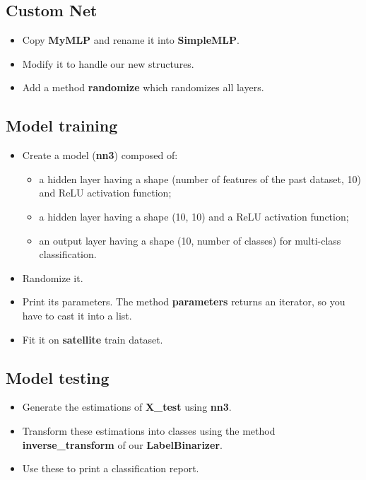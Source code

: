 \documentclass[11pt, a4paper]{article}
\begin{document}
\begin{multicols}{2}
	\subsection{Custom Net}
	
	\begin{itemize}  
		\item Copy \textbf{MyMLP} and rename it into \textbf{SimpleMLP}.
		\item Modify it to handle our new structures.
		\item Add a method \textbf{randomize} which randomizes all layers. 
	\end{itemize}
	
	\subsection{Model training} 
	\begin{itemize}  
		\item Create a model (\textbf{nn3}) composed of:
		\begin{itemize} 
			\item a hidden layer having a shape (number of features of the past dataset, 10) and ReLU activation function;
			\item a hidden layer having a shape (10, 10) and a ReLU activation function;
			\item an output layer having a shape (10, number of classes) for multi-class classification.
		\end{itemize}
		\item Randomize it.
		\item Print its parameters. The method \textbf{parameters} returns an iterator, so you have to cast it into a list.
		\item Fit it on \textbf{satellite} train dataset.
	\end{itemize}
	
	\subsection{Model testing} 
	
	\begin{itemize}  
		\item Generate the estimations of \textbf{X\_test} using \textbf{nn3}.
		\item Transform these estimations into classes using the method \textbf{inverse\_transform} of our \textbf{LabelBinarizer}.
		\item Use these to print a classification report.
	\end{itemize}
	
	
\end{multicols}
\end{document}
